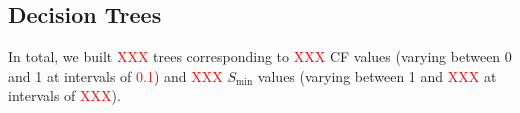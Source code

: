 \subsection{Decision Trees}

In total, we built \textcolor{red}{XXX} trees corresponding to \textcolor{red}{XXX} CF values (varying between 0 and 1 at intervals of \textcolor{red}{0.1}) and \textcolor{red}{XXX} $S_{\min}$ values (varying between 1 and \textcolor{red}{XXX} at intervals of \textcolor{red}{XXX}). 


% 

% 
